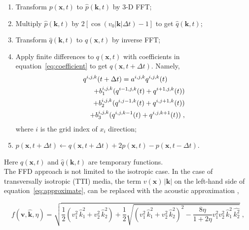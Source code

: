 \begin{enumerate}
\item Transform $p(\mathbf{x},t)$ to $\hat{p}(\mathbf{k},t)$ by 3-D FFT;
\item Multiply $\hat{p}(\mathbf{k},t)$ by $2\left[\cos(v_0|\mathbf{k}|\Delta t)-1\right]$ to get $\hat{q}(\mathbf{k},t)$;
\item Transform $\hat{q}(\mathbf{k},t)$ to $q(\mathbf{x},t)$ by inverse FFT;
\item Apply finite differences to $q(\mathbf{x},t)$ with coefficients in equation~\ref{eq:coefficient} to get $q(\mathbf{x},t+\Delta t)$. 
Namely,
\begin{eqnarray}
\label{eq:fd}
\lefteqn{q^{i,j,k}(t+\Delta t) = a^{i,j,k}q^{i,j,k}(t)}\nonumber \\
& & +b_1^{i,j,k}(q^{i-1,j,k}(t)+q^{i+1,j,k}(t)) \nonumber \\
& & +b_2^{i,j,k}(q^{i,j-1,k}(t)+q^{i,j+1,k}(t))\nonumber \\
& & +b_3^{i,j,k}(q^{i,j,k-1}(t)+q^{i,j,k+1}(t))\;,
\end{eqnarray} 
where $i$ is the grid index of $x_i$ direction;
\item $p(\mathbf{x},t+\Delta t) \leftarrow q(\mathbf{x},t+\Delta t) + 2p(\mathbf{x},t) - p(\mathbf{x}, t-\Delta t)$.
\end{enumerate}
Here $q(\mathbf{x},t)$ and $\hat{q}(\mathbf{k},t)$ are temporary functions.\\

The FFD approach is not limited to the isotropic case. 
In the case of transversally isotropic (TTI) media, the term $v(\mathbf{x})\,|\mathbf{k}|$ on the left-hand side of equation~\ref{eq:approximate},
can be replaced with the acoustic approximation \cite[]{alkhalifah1,alkhalifah2,anelliptic},


\begin{equation}
\label{eq:ttiexact} 
f(\mathbf{v},\mathbf{\hat{k}},\eta)=\sqrt{\frac{1}{2}(v_1^2\,\hat{k}_1^2+v_2^2\,\hat{k}_2^2)+\frac{1}{2}\sqrt{(v_1^2\,\hat{k}_1^2+v_2^2\,\hat{k}_2^2)^2-\frac{8\eta}{1+2\eta}v_1^2v_2^2\,\hat{k}_1^2\,\hat{k_2^2}}}\;, 
\end{equation} 

